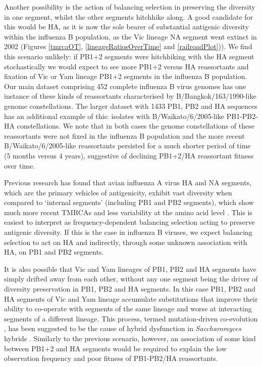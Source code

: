 \documentclass[11pt,oneside,letterpaper]{article}
\begin{document}
Another possibility is the action of balancing selection in preserving the diversity in one segment, whilst the other segments hitchhike along.
A good candidate for this would be HA, as it is now the sole bearer of substantial antigenic diversity within the influenza B population, as the Vic lineage NA segment went extinct in 2002 (Figures \ref{tmrcaOT}, \ref{lineageRatiosOverTime} and \ref{railroadPlot})).
We find this scenario unlikely: if PB1+2 segments were hitchhiking with the HA segment stochastically we would expect to see more PB1+2 versus HA reassortants and fixation of Vic or Yam lineage PB1+2 segments in the influenza B population.
Our main dataset comprising 452 complete influenza B virus genomes has one instance of these kinds of reassortants characterised by B/Bangkok/163/1990-like genome constellations.
The larger dataset with 1433 PB1, PB2 and HA sequences has an additional example of this: isolates with B/Waikato/6/2005-like PB1-PB2-HA constellations.
We note that in both cases the genome constellations of these reassortants were not fixed in the influenza B population and the more recent B/Waikato/6/2005-like reassortants persisted for a much shorter period of time (5 months versus 4 years), suggestive of declining PB1+2/HA reassortant fitness over time.

Previous research has found that avian influenza A virus HA and NA segments, which are the primary vehicles of antigenicity, exhibit vast diversity when compared to `internal segments' (including PB1 and PB2 segments), which show much more recent TMRCAs and less variability at the amino acid level \cite{chen2006,obenauer2006}.
This is easiest to interpret as frequency-dependent balancing selection acting to preserve antigenic diversity.
If this is the case in influenza B viruses, we expect balancing selection to act on HA and indirectly, through some unknown association with HA, on PB1 and PB2 segments.

It is also possible that Vic and Yam lineages of PB1, PB2 and HA segments have simply drifted away from each other, without any one segment being the driver of diversity preservation in PB1, PB2 and HA segments.
In this case PB1, PB2 and HA segments of Vic and Yam lineage accumulate substitutions that improve their ability to co-operate with segments of the same lineage and worse at interacting segments of a different lineage.
This process, termed mutation-driven co-evolution \cite{presgraves2010}, has been suggested to be the cause of hybrid dysfunction in \textit{Saccharomyces} hybrids \cite{lee2008}.
Similarly to the previous scenario, however, an association of some kind between PB1+2 and HA segments would be required to explain the low observation frequency and poor fitness of PB1-PB2/HA reassortants.
\end{document}
